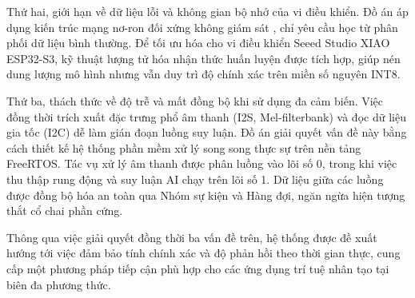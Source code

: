 Thứ hai, giới hạn về dữ liệu lỗi và không gian bộ nhớ của vi điều khiển. Đồ án áp dụng kiến trúc mạng nơ-ron đối xứng không giám sát \cite{ref_1_5}, chỉ yêu cầu học từ phân phối dữ liệu bình thường. Để tối ưu hóa cho vi điều khiển Seeed Studio XIAO ESP32-S3, kỹ thuật lượng tử hóa nhận thức huấn luyện được tích hợp, giúp nén dung lượng mô hình nhưng vẫn duy trì độ chính xác trên miền số nguyên INT8.

Thứ ba, thách thức về độ trễ và mất đồng bộ khi sử dụng đa cảm biến. Việc đồng thời trích xuất đặc trưng phổ âm thanh (I2S, Mel-filterbank) và đọc dữ liệu gia tốc (I2C) dễ làm gián đoạn luồng suy luận. Đồ án giải quyết vấn đề này bằng cách thiết kế hệ thống phần mềm xử lý song song thực sự trên nền tảng FreeRTOS. Tác vụ xử lý âm thanh được phân luồng vào lõi số 0, trong khi việc thu thập rung động và suy luận AI chạy trên lõi số 1. Dữ liệu giữa các luồng được đồng bộ hóa an toàn qua Nhóm sự kiện và Hàng đợi, ngăn ngừa hiện tượng thắt cổ chai phần cứng.

Thông qua việc giải quyết đồng thời ba vấn đề trên, hệ thống được đề xuất hướng tới việc đảm bảo tính chính xác và độ phản hồi theo thời gian thực, cung cấp một phương pháp tiếp cận phù hợp cho các ứng dụng trí tuệ nhân tạo tại biên đa phương thức.

